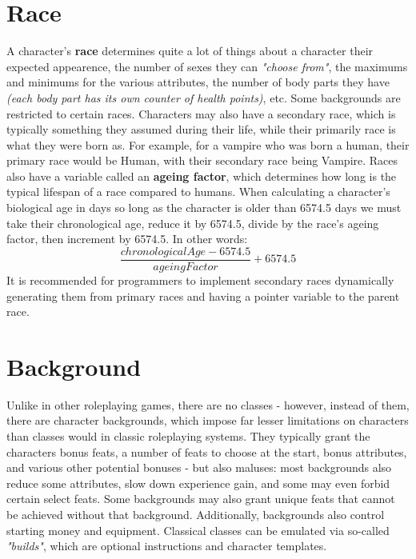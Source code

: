 \documentclass[tikz,openany,11pt,a4paper]{book}
\begin{document}
\section{Race}
A character's \textbf{race} determines quite a lot of things about a character \textemdash their expected appearence, the number of sexes they can \textit{"choose from"}, the maximums and minimums for the various attributes, the number of body parts they have \textit{(each body part has its own counter of health points)}, etc. Some backgrounds are restricted to certain races.\newline
Characters may also have a secondary race, which is typically something they assumed during their life, while their primarily race is what they were born as. For example, for a vampire who was born a human, their primary race would be Human, with their secondary race being Vampire.\newline
Races also have a variable called an \textbf{ageing factor}, which determines how long is the typical lifespan of a race compared to humans. When calculating a character's biological age in days \textemdash so long as the character is older than 6574.5 days \textemdash we must take their chronological age, reduce it by 6574.5, divide by the race's ageing factor, then increment by 6574.5. In other words: \[\frac{chronologicalAge-6574.5}{ageingFactor}+6574.5\]
It is recommended for programmers to implement secondary races dynamically generating them from primary races and having a pointer variable to the parent race. 
\section{Background}
Unlike in other roleplaying games, there are no classes - however, instead of them, there are character backgrounds, which impose far lesser limitations on characters than classes would in classic roleplaying systems. They typically grant the characters bonus feats, a number of feats to choose at the start, bonus attributes, and various other potential bonuses - but also maluses: most backgrounds also reduce some attributes, slow down experience gain, and some may even forbid certain select feats. Some backgrounds may also grant unique feats that cannot be achieved without that background. Additionally, backgrounds also control starting money and equipment.\newline
Classical classes can be emulated via so-called \textit{"builds"}, which are optional instructions and character templates.
\end{document}
